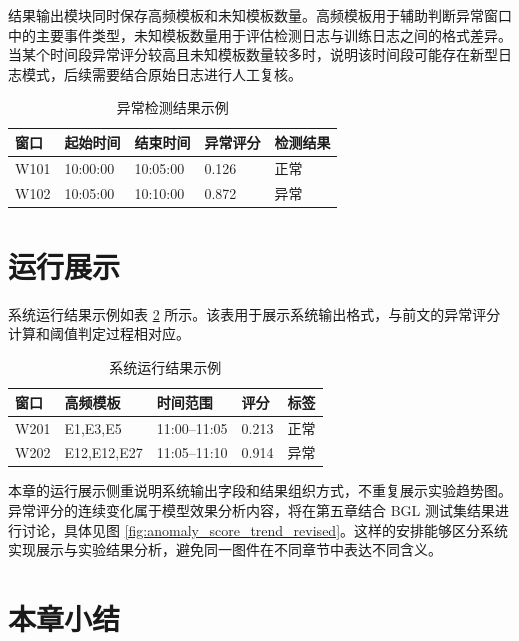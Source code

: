 结果输出模块同时保存高频模板和未知模板数量。高频模板用于辅助判断异常窗口中的主要事件类型，未知模板数量用于评估检测日志与训练日志之间的格式差异。当某个时间段异常评分较高且未知模板数量较多时，说明该时间段可能存在新型日志模式，后续需要结合原始日志进行人工复核。

\begin{table}[htbp]
    \centering
    \caption{异常检测结果示例}
    \label{tab:detection_result_example_revised}
    \begin{tabular}{p{1.4cm}p{3cm}p{3cm}p{2cm}p{2cm}}
        \hline
        \textbf{窗口} & \textbf{起始时间} & \textbf{结束时间} & \textbf{异常评分} & \textbf{检测结果} \\
        \hline
        W101 & 10:00:00 & 10:05:00 & 0.126 & 正常 \\
        W102 & 10:05:00 & 10:10:00 & 0.872 & 异常 \\
        \hline
    \end{tabular}
\end{table}

\section{运行展示}

系统运行结果示例如表 \ref{tab:system_running_result_revised} 所示。该表用于展示系统输出格式，与前文的异常评分计算和阈值判定过程相对应。

\begin{table}[htbp]
    \centering
    \caption{系统运行结果示例}
    \label{tab:system_running_result_revised}
    \begin{tabular}{p{1.6cm}p{3.4cm}p{3.2cm}p{2cm}p{1.8cm}}
        \hline
        \textbf{窗口} & \textbf{高频模板} & \textbf{时间范围} & \textbf{评分} & \textbf{标签} \\
        \hline
        W201 & E1,E3,E5 & 11:00--11:05 & 0.213 & 正常 \\
        W202 & E12,E12,E27 & 11:05--11:10 & 0.914 & 异常 \\
        \hline
    \end{tabular}
\end{table}

本章的运行展示侧重说明系统输出字段和结果组织方式，不重复展示实验趋势图。异常评分的连续变化属于模型效果分析内容，将在第五章结合 BGL 测试集结果进行讨论，具体见图 \ref{fig:anomaly_score_trend_revised}。这样的安排能够区分系统实现展示与实验结果分析，避免同一图件在不同章节中表达不同含义。

\section{本章小结}

